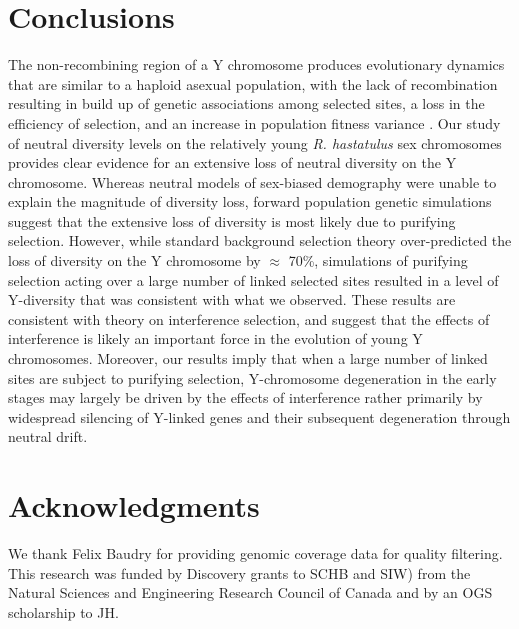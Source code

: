\documentclass[9pt,twocolumn,twoside]{gsajnl}
\begin{document}
\section*{Conclusions}
The non-recombining region of a Y chromosome produces evolutionary dynamics that are similar to a haploid asexual population, with the lack of recombination resulting in build up of genetic associations among selected sites, a loss in the efficiency of selection, and an increase in population fitness variance \citep{fisher1930genetical, muller1964relation, hill1966HReffect, mcvean2000,KaiserCharlesworth,good2014genetic}. Our study of neutral diversity levels on the relatively young \textit{R. hastatulus} sex chromosomes provides clear evidence for an extensive loss of neutral diversity on the Y chromosome. Whereas neutral models of sex-biased demography were unable to explain the magnitude of diversity loss, forward population genetic simulations suggest that the extensive loss of diversity is most likely due to purifying selection. However, while standard background selection theory over-predicted the loss of diversity on the Y chromosome by $\approx$ 70\%, simulations of purifying selection acting over a large number of linked selected sites resulted in a level of Y-diversity that was consistent with what we observed. These results are consistent with theory on interference selection, and suggest that the effects of interference is likely an important force in the evolution of young Y chromosomes. Moreover, our results imply that when a large number of linked sites are subject to purifying selection, Y-chromosome degeneration in the early stages may largely be driven by the effects of interference rather primarily by widespread silencing of Y-linked genes and their subsequent degeneration through neutral drift.

\section*{Acknowledgments}
We thank Felix Baudry for providing genomic coverage data for quality filtering. This research was funded by Discovery grants to SCHB and SIW) from the Natural Sciences and Engineering Research Council of Canada and by an OGS scholarship to JH.

\end{document}

